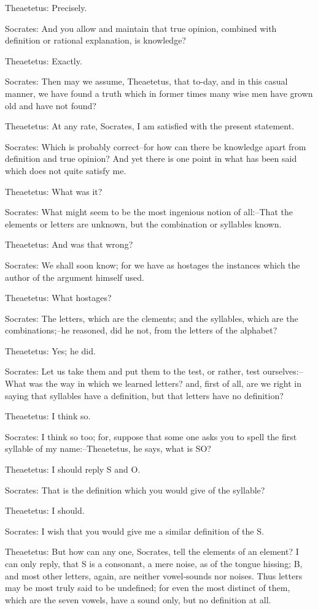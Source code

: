 Theaetetus: Precisely.

Socrates: And you allow and maintain that true opinion, combined with
definition or rational explanation, is knowledge?

Theaetetus: Exactly.

Socrates: Then may we assume, Theaetetus, that to-day, and in this
casual manner, we have found a truth which in former times many wise men
have grown old and have not found?

Theaetetus: At any rate, Socrates, I am satisfied with the present
statement.

Socrates: Which is probably correct--for how can there be knowledge
apart from definition and true opinion? And yet there is one point in
what has been said which does not quite satisfy me.

Theaetetus: What was it?

Socrates: What might seem to be the most ingenious notion of all:--That
the elements or letters are unknown, but the combination or syllables
known.

Theaetetus: And was that wrong?

Socrates: We shall soon know; for we have as hostages the instances
which the author of the argument himself used.

Theaetetus: What hostages?

Socrates: The letters, which are the clements; and the syllables, which
are the combinations;--he reasoned, did he not, from the letters of the
alphabet?

Theaetetus: Yes; he did.

Socrates: Let us take them and put them to the test, or rather, test
ourselves:--What was the way in which we learned letters? and, first of
all, are we right in saying that syllables have a definition, but that
letters have no definition?

Theaetetus: I think so.

Socrates: I think so too; for, suppose that some one asks you to spell
the first syllable of my name:--Theaetetus, he says, what is SO?

Theaetetus: I should reply S and O.

Socrates: That is the definition which you would give of the syllable?

Theaetetus: I should.

Socrates: I wish that you would give me a similar definition of the S.

Theaetetus: But how can any one, Socrates, tell the elements of an
element? I can only reply, that S is a consonant, a mere noise, as
of the tongue hissing; B, and most other letters, again, are neither
vowel-sounds nor noises. Thus letters may be most truly said to be
undefined; for even the most distinct of them, which are the seven
vowels, have a sound only, but no definition at all.

